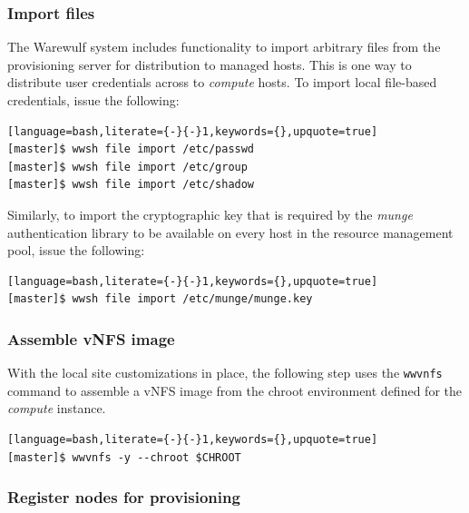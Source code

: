 \documentclass[letterpaper]{article}
\begin{document}
\subsubsection{Import files} \label{sec:file_import}

The Warewulf system includes functionality to import arbitrary files from the
provisioning server for distribution to managed hosts. This is one way
to distribute user credentials across to {\em compute} hosts. To
import local file-based credentials, issue the following:

\begin{lstlisting}[language=bash,literate={-}{-}1,keywords={},upquote=true]
[master]$ wwsh file import /etc/passwd                                                                                                       
[master]$ wwsh file import /etc/group
[master]$ wwsh file import /etc/shadow 
\end{lstlisting}

Similarly, to import the cryptographic key that is required by the {\em munge}
authentication library to be available on every host in the resource management
pool, issue the following:

\begin{lstlisting}[language=bash,literate={-}{-}1,keywords={},upquote=true]
[master]$ wwsh file import /etc/munge/munge.key
\end{lstlisting}


\subsubsection{Assemble vNFS image}

With the local site customizations in place, the following step uses the
\texttt{wwvnfs} command to assemble a vNFS image from the chroot environment
defined for the {\em compute} instance. 

\begin{lstlisting}[language=bash,literate={-}{-}1,keywords={},upquote=true]
[master]$ wwvnfs -y --chroot $CHROOT
\end{lstlisting}

\subsubsection{Register nodes for provisioning}
\end{document}
